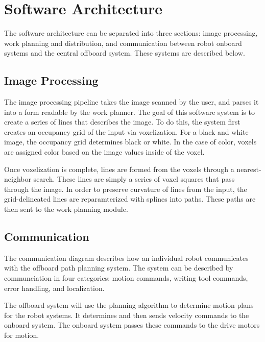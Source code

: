 
\section{Software Architecture}
\label{sec:software_architecture}
The software architecture can be separated into three sections: image processing, work planning and distribution, and communication between robot onboard systems and the central offboard system. These systems are described below.

\subsection{Image Processing}
\label{sec:sw_arch_image_processing}

The image processing pipeline takes the image scanned by the user, and parses it into a form readable by the work planner. The goal of this software system is to create a series of lines that describes the image. To do this, the system first creates an occupancy grid of the input via voxelization. For a black and white image, the occupancy grid determines black or white. In the case of color, voxels are assigned color based on the image values inside of the voxel.

Once voxelization is complete, lines are formed from the voxels through a nearest-neighbor search. These lines are simply a series of voxel squares that pass through the image. In order to preserve curvature of lines from the input, the grid-delineated lines are reparamterized with splines into paths. These paths are then sent to the work planning module.

\subsection{Communication}
\label{sec:sw_arch_communication}
The communication diagram describes how an individual robot communicates with the offboard path planning system. The system can be described by communciation in four categories: motion commands, writing tool commands, error handling, and localization.

The offboard system will use the planning algorithm to determine motion plans for the robot systems. It determines and then sends velocity commands to the onboard system. The onboard system passes these commands to the drive motors for motion.

